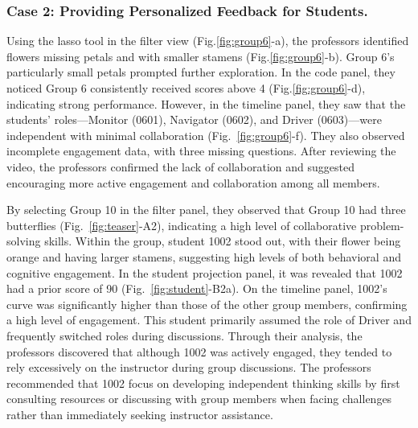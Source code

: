 \subsubsection{Case 2: Providing Personalized Feedback for Students.}
Using the lasso tool in the filter view (Fig.\ref{fig:group6}-a), the professors identified flowers missing petals and with smaller stamens (Fig.\ref{fig:group6}-b). Group 6's particularly small petals prompted further exploration. In the code panel, they noticed Group 6 consistently received scores above 4 (Fig.\ref{fig:group6}-d), indicating strong performance. 
However, in the timeline panel, they saw that the students' roles—Monitor (0601), Navigator (0602), and Driver (0603)—were independent with minimal collaboration (Fig.~\ref{fig:group6}-f). They also observed incomplete engagement data, with three missing questions. After reviewing the video, the professors confirmed the lack of collaboration and suggested encouraging more active engagement and collaboration among all members.


By selecting Group 10 in the filter panel, they observed that Group 10 had three butterflies (Fig.~\ref{fig:teaser}-A2), indicating a high level of collaborative problem-solving skills. 
Within the group, student 1002 stood out, with their flower being orange and having larger stamens, suggesting high levels of both behavioral and cognitive engagement. In the student projection panel, it was revealed that 1002 had a prior score of 90 (Fig.~\ref{fig:student}-B2a). 
On the timeline panel, 1002's curve was significantly higher than those of the other group members, confirming a high level of engagement. This student primarily assumed the role of Driver and frequently switched roles during discussions.
Through their analysis, the professors discovered that although 1002 was actively engaged, they tended to rely excessively on the instructor during group discussions.  
The professors recommended that 1002 focus on developing independent thinking skills by first consulting resources or discussing with group members when facing challenges rather than immediately seeking instructor assistance. 







